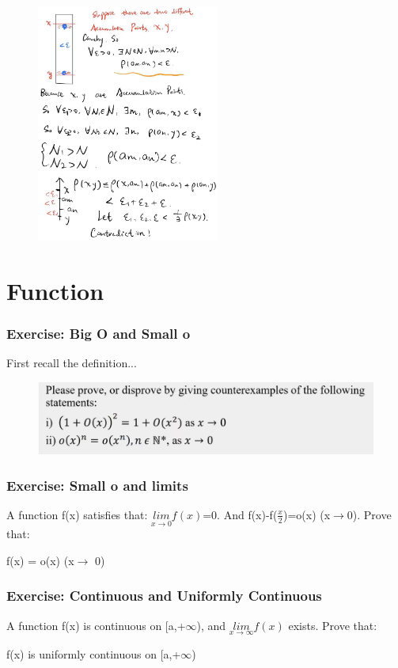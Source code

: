 \documentclass{beamer}
\begin{document}
\begin{frame}
    \begin{figure}[htbp]
        \centering
        \includegraphics[width=6cm]{answerMetric2.png}
    \end{figure}
\end{frame}

\section{Function}
\begin{frame}
    \frametitle{Exercise: Big O and Small o}
    First recall the definition...
    \begin{figure}[htbp]
        \centering
        \includegraphics[width=12cm]{bigOsmallo.png}
    \end{figure}
\end{frame}


\begin{frame}
    \frametitle{Exercise: Small o and limits}
    A function f(x) satisfies that: $\underset{x\rightarrow 0}{lim}f(x)$=0. And f(x)-f($\frac{x}{2}$)=o(x) (x$\rightarrow$0). Prove that:

    \begin{center}
        f(x) = o(x) (x$\rightarrow$ 0)
    \end{center}

\end{frame}

\begin{frame}
    \frametitle{Exercise: Continuous and Uniformly Continuous}
    A function f(x) is continuous on [a,+$\infty$), and $\underset{x\rightarrow \infty}{lim}f(x)$ exists. Prove that:

    \begin{center}
        f(x) is uniformly continuous on [a,+$\infty$)
    \end{center}
\end{frame}
\end{document}
